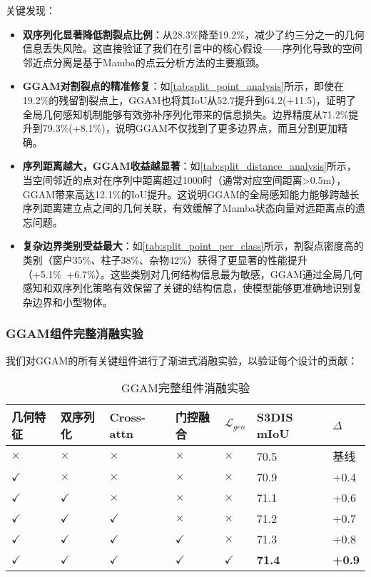 \documentclass[preprint,12pt]{elsarticle}
\begin{document}
关键发现：
\begin{itemize}
	\item \textbf{双序列化显著降低割裂点比例}：从28.3\%降至19.2\%，减少了约三分之一的几何信息丢失风险。这直接验证了我们在引言中的核心假设——序列化导致的空间邻近点分离是基于Mamba的点云分析方法的主要瓶颈。
	
	\item \textbf{GGAM对割裂点的精准修复}：如\cref{tab:split_point_analysis}所示，即使在19.2\%的残留割裂点上，GGAM也将其IoU从52.7提升到64.2(+11.5)，证明了全局几何感知机制能够有效弥补序列化带来的信息损失。边界精度从71.2\%提升到79.3\%(+8.1\%)，说明GGAM不仅找到了更多边界点，而且分割更加精确。
	
	\item \textbf{序列距离越大，GGAM收益越显著}：如\cref{tab:split_distance_analysis}所示，当空间邻近的点对在序列中距离超过1000时（通常对应空间距离>0.5m），GGAM带来高达12.1\%的IoU提升。这说明GGAM的全局感知能力能够跨越长序列距离建立点之间的几何关联，有效缓解了Mamba状态向量对远距离点的遗忘问题。
	
	\item \textbf{复杂边界类别受益最大}：如\cref{tab:split_point_per_class}所示，割裂点密度高的类别（窗户35\%、柱子38\%、杂物42\%）获得了更显著的性能提升（+5.1\%~+6.7\%）。这些类别对几何结构信息最为敏感，GGAM通过全局几何感知和双序列化策略有效保留了关键的结构信息，使模型能够更准确地识别复杂边界和小型物体。
\end{itemize}

\subsubsection{GGAM组件完整消融实验}
我们对GGAM的所有关键组件进行了渐进式消融实验，以验证每个设计的贡献：

\begin{table}[htbp!]
	\centering
	\caption{GGAM完整组件消融实验}
	\label{tab:ggam_full_ablation}
	\begin{tabular}{@{}lllllll@{}}
		\toprule
		几何特征 & 双序列化 & Cross-attn & 门控融合 & $\mathcal{L}_{geo}$ & S3DIS mIoU & $\Delta$ \\ 
		\midrule
		$\times$ & $\times$ & $\times$ & $\times$ & $\times$ & 70.5 & 基线 \\
		\midrule
		$\checkmark$ & $\times$ & $\times$ & $\times$ & $\times$ & 70.9 & +0.4 \\
		$\checkmark$ & $\checkmark$ & $\times$ & $\times$ & $\times$ & 71.1 & +0.6 \\
		$\checkmark$ & $\checkmark$ & $\checkmark$ & $\times$ & $\times$ & 71.2 & +0.7 \\
		$\checkmark$ & $\checkmark$ & $\checkmark$ & $\checkmark$ & $\times$ & 71.3 & +0.8 \\
		\textbf{$\checkmark$} & \textbf{$\checkmark$} & \textbf{$\checkmark$} & \textbf{$\checkmark$} & \textbf{$\checkmark$} & \textbf{71.4} & \textbf{+0.9} \\
		\bottomrule
	\end{tabular}
\end{table}
\end{document}
